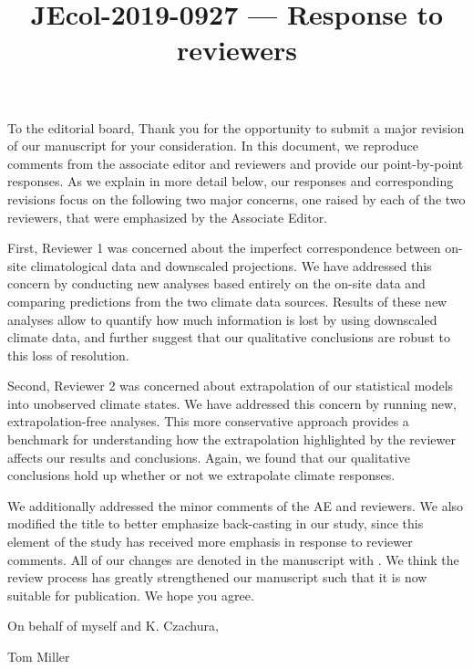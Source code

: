 \documentclass[12pt]{article}
\newcommand{\revise}[1]{{\color{Mahogany}{#1}}}
\begin{document}
\title{JEcol-2019-0927 --- Response to reviewers}

\maketitle
\noindent To the editorial board,
Thank you for the opportunity to submit a major revision of our manuscript for your consideration. 
In this document, we reproduce comments from the associate editor and reviewers and provide our point-by-point responses. As we explain in more detail below, our responses and corresponding revisions focus on the following two major concerns, one raised by each of the two reviewers, that were emphasized by the Associate Editor.

First, Reviewer 1 was concerned about the imperfect correspondence between on-site climatological data and downscaled projections. 
We have addressed this concern by conducting new analyses based entirely on the on-site data and comparing predictions from the two climate data sources.
Results of these new analyses allow to quantify how much information is lost by using downscaled climate data, and further suggest that our qualitative conclusions are robust to this loss of resolution. 

Second, Reviewer 2 was concerned about extrapolation of our statistical models into unobserved climate states. 
We have addressed this concern by running new, extrapolation-free analyses.
This more conservative approach provides a benchmark for understanding how the extrapolation highlighted by the reviewer affects our results and conclusions. 
Again, we found that our qualitative conclusions hold up whether or not we extrapolate climate responses. 

We additionally addressed the minor comments of the AE and reviewers. 
We also modified the title to better emphasize back-casting in our study, since this element of the study has received more emphasis in response to reviewer comments.
All of our changes are denoted in the manuscript with \revise{Mahogany font}.
We think the review process has greatly strengthened our manuscript such that it is now suitable for publication.
We hope you agree. 

\vspace{2em}
\hfill On behalf of myself and K. Czachura,

\hfill Tom Miller
\newpage
\end{document}
